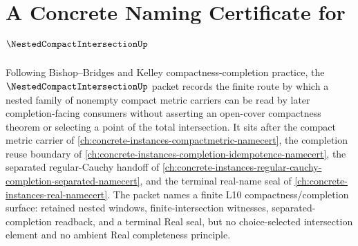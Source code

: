 \chapter{A Concrete Naming Certificate for $\NestedCompactIntersectionUp$}
\label{ch:concrete-instances-nested-compact-intersection-namecert}

Following Bishop--Bridges and Kelley compactness-completion practice, the $\NestedCompactIntersectionUp$ packet records the finite route by which a nested family of nonempty compact metric carriers can be read by later completion-facing consumers without asserting an open-cover compactness theorem or selecting a point of the total intersection. It sits after the compact metric carrier of \autoref{ch:concrete-instances-compactmetric-namecert}, the completion reuse boundary of \autoref{ch:concrete-instances-completion-idempotence-namecert}, the separated regular-Cauchy handoff of \autoref{ch:concrete-instances-regular-cauchy-completion-separated-namecert}, and the terminal real-name seal of \autoref{ch:concrete-instances-real-namecert}. The packet names a finite L10 compactness/completion surface: retained nested windows, finite-intersection witnesses, separated-completion readback, and a terminal Real seal, but no choice-selected intersection element and no ambient Real completeness principle.

